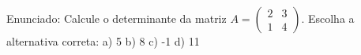 \documentclass[preview]{standalone}
\begin{document}
\begin{center}
Enunciado: Calcule o determinante da matriz \( A = \begin{pmatrix} 2 & 3 \\ 1 & 4 \end{pmatrix} \). Escolha a alternativa correta: a) 5  b) 8  c) -1  d) 11
\end{center}
\end{document}
